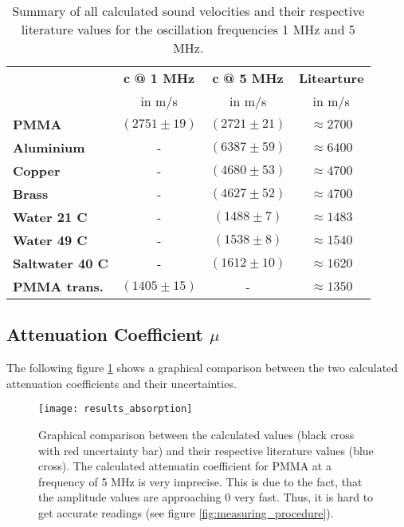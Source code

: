 \begin{table}[H]
	\centering
	\renewcommand{\arraystretch}{1.1}
	\begin{tabular}{|l|c|c|c|}
		\cline{2-4}
		\multicolumn{1}{c|}{} & $\boldsymbol{c}$ \textbf{@ 1 MHz} & $\boldsymbol{c}$ \textbf{@ 5 MHz} & \textbf{Litearture} \\
		\multicolumn{1}{c|}{} & in m/s & in m/s & in m/s \\
		\hline
		\textbf{PMMA} & $(2751\pm 19)$ & $(2721\pm 21)$ & $\approx 2700$ \\
		\hline
		\textbf{Aluminium} & - & $(6387\pm 59)$ & $\approx 6400$ \\
		\hline
		\textbf{Copper} & - & $(4680\pm 53)$ & $\approx 4700$ \\
		\hline
		\textbf{Brass} & - & $(4627\pm 52)$ & $\approx 4700$ \\
		\hline
		\textbf{Water 21 \textdegree C} & - & $(1488\pm 7)$ & $\approx 1483$ \\
		\hline
		\textbf{Water 49 \textdegree C} & - & $(1538\pm 8)$ & $\approx 1540$ \\
		\hline
		\textbf{Saltwater 40 \textdegree C} & - & $(1612\pm 10)$ & $\approx 1620$ \\
		\hline
		\textbf{PMMA trans.} & $(1405\pm 15)$ & - & $\approx 1350$ \\
		\hline
	\end{tabular}
	\caption{Summary of all calculated sound velocities and their respective literature values for the oscillation frequencies 1 MHz and 5 MHz.}
	\label{tab:Ultrasound_Speed}
\end{table}

\subsection{Attenuation Coefficient $\mu$}
\label{subsec:Attenuation_Coefficient}
The following figure \ref{fig:results_absorption} shows a graphical comparison between the two calculated attenuation coefficients and their uncertainties.

\begin{figure}[H]
	\centering
	\texttt{[image: results\_absorption]}
	\caption{Graphical comparison between the calculated values (black cross with red uncertainty bar) and their respective literature values (blue cross). The calculated attenuatin coefficient for PMMA at a frequency of 5 MHz is very imprecise. This is due to the fact, that the amplitude values are approaching 0 very fast. Thus, it is hard to get accurate readings (see figure \ref{fig:measuring_procedure}).}
	\label{fig:results_absorption}
\end{figure}


